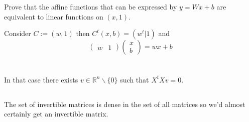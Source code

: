 \documentclass{article}
\begin{document}
\section{}
Prove that the affine functions that can be expressed by $y = Wx + b$ are equivalent to linear functions on $(x, 1)$.

Consider $C := (w, 1)$ then $C^t(x, b) = (w^t|1)$ and
$$
\begin{pmatrix}
w & 1
\end{pmatrix}
\begin{pmatrix}
x \\ b
\end{pmatrix} = 
wx + b
$$

\section{}

\section{}
\subsection{}
In that case there exists $v \in \mathbb{R}^n \backslash \{0\}$ such that $X^tXv = 0$.

\subsection{}
The set of invertible matrices is dense in the set of all matrices so we'd almost certainly get an invertible matrix.

\section{}
\end{document}
